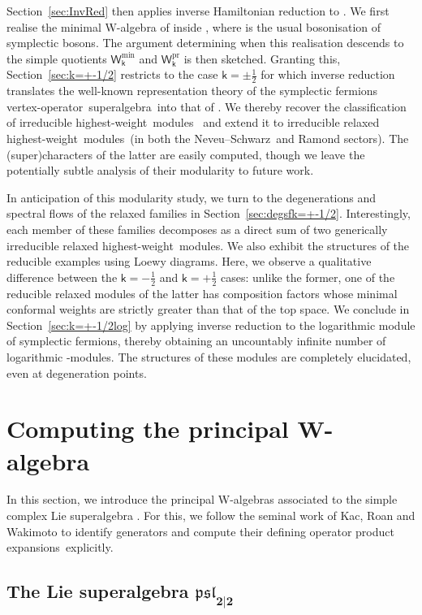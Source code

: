 \documentclass[pdftex]{sigma}
\numberwithin{equation}{section}
\newcommand{\kk}{\mathsf{k}} %
\newcommand{\alg}[1]{\mathfrak{#1}} %
\newcommand{\VOA}[1]{\mathsf{#1}} %
\newcommand{\SLSA}[3]{\alg{#1}_{#2 \vert #3}} %
\newcommand{\psl}{\SLSA{psl}{2}{2}}
\newcommand{\lsymb}{\Pi}
\newcommand{\lvoa}{\lsymb} %
\newcommand{\uwalg}[2]{\VOA{W}^{#1}_{\mathrm{#2}}} %
\newcommand{\swalg}[2]{\VOA{W}_{#1}^{\mathrm{#2}}} %
\newcommand{\upr}[1][\kk]{\uwalg{#1}{pr}} %
\newcommand{\umin}[1][\kk]{\uwalg{#1}{min}} %
\newcommand{\spr}[1][\kk]{\swalg{#1}{pr}} %
\newcommand{\smin}[1][\kk]{\swalg{#1}{min}} %
\newcommand{\sminpmhalf}{\smin[\pm 1/2]}
\newcommand{\ns}{Neveu--Schwarz}
\newcommand{\hw}{highest-weight}
\newcommand{\hwm}{\hw\ module}
\newcommand{\hwms}{\hwm s}
\newcommand{\rhw}{relaxed highest-weight}
\newcommand{\rhwm}{\rhw\ module}
\newcommand{\rhwms}{\rhwm s}
\newcommand{\vo}{vertex-operator}
\newcommand{\svoa}{\vo\ superalgebra}
\newcommand{\ope}{operator product expansion}
\newcommand{\opes}{\ope s}
\begin{document}
Section~\ref{sec:InvRed} then applies inverse Hamiltonian reduction to \smash{$\upr$}.
We first realise the minimal W-algebra \smash{$\umin$} of \smash{$\psl$} inside \smash{$\upr \otimes \lvoa$}, where \smash{$\lvoa$} is the usual bosonisation of symplectic bosons.
The argument determining when this realisation descends to the simple quotients $\smin$ and $\spr$ is then sketched.
Granting this, Section~\ref{sec:k=+-1/2} restricts to the case $\kk=\pm\frac{1}{2}$ for which inverse reduction translates the well-known representation theory of the symplectic fermions \svoa\ into that of \smash{$\sminpmhalf$}.
We thereby recover the classification of irreducible \hwms\ \cite{AdaRea14} and extend it to irreducible \rhwms\ (in both the \ns\ and Ramond sectors).
The (super)characters of the latter are easily computed, though we leave the potentially subtle analysis of their modularity to future work.

In anticipation of this modularity study, we turn to the degenerations and spectral flows of the relaxed families in Section~\ref{sec:degsfk=+-1/2}.
Interestingly, each member of these families decomposes as a direct sum of two generically irreducible \rhwms.
We also exhibit the structures of the reducible examples using Loewy diagrams.
Here, we observe a qualitative difference between the $\kk=-\frac{1}{2}$ and $\kk=+\frac{1}{2}$ cases: unlike the former, one of the reducible relaxed modules of the latter has composition factors whose minimal conformal weights are strictly greater than that of the top space.
We conclude in Section~\ref{sec:k=+-1/2log} by applying inverse reduction to the logarithmic module of symplectic fermions, thereby obtaining an uncountably infinite number of logarithmic \smash{$\sminpmhalf$}-modules.
The structures of these modules are completely elucidated, even at degeneration points.

\section{Computing the principal W-algebra} \label{sec:principal}

In this section, we introduce the principal W-algebras associated to the simple complex Lie superalgebra \smash{$\psl$}.
For this, we follow the seminal work of Kac, Roan and Wakimoto \cite{KacQua03} to identify generators and compute their defining \opes\ explicitly.

\subsection[The Lie superalgebra psl]{The Lie superalgebra $\boldsymbol{\psl}$} \label{sec:psl}
\end{document}
